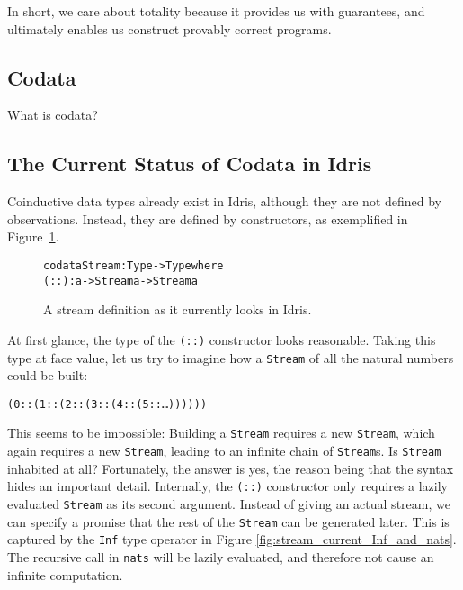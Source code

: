 In short, we care about totality because it provides us with guarantees, and ultimately enables us construct provably correct programs.


\subsection{Codata}
What is codata?

\subsection{The Current Status of Codata in Idris}
Coinductive data types already exist in Idris, although they are not defined by observations. Instead, they are defined by constructors, as exemplified in Figure~\ref{fig:stream_current}. 

\begin{figure}
\begin{alltt}
codata Stream : Type -> Type where
  (::) : a -> Stream a -> Stream a
\end{alltt}
\caption{A stream definition as it currently looks in Idris.}
\label{fig:stream_current}
\end{figure}

At first glance, the type of the \texttt{(::)} constructor looks reasonable. Taking this type at face value, let us try to imagine how a \texttt{Stream} of all the natural numbers could be built:

\begin{alltt}
(0 :: (1 :: (2 :: (3 :: (4 :: (5 :: \ldots))))))
\end{alltt}

This seems to be impossible: Building a \texttt{Stream} requires a new \texttt{Stream}, which again requires a new \texttt{Stream}, leading to an infinite chain of \texttt{Stream}s. Is \texttt{Stream} inhabited at all? Fortunately, the answer is yes, the reason being that the syntax hides an important detail. Internally, the \texttt{(::)} constructor only requires a lazily evaluated \texttt{Stream} as its second argument. Instead of giving an actual stream, we can specify a promise that the rest of the \texttt{Stream} can be generated later. This is captured by the \texttt{Inf} type operator in Figure \ref{fig:stream_current_Inf_and_nats}. The recursive call in \texttt{nats} will be lazily evaluated, and therefore not cause an infinite computation.

